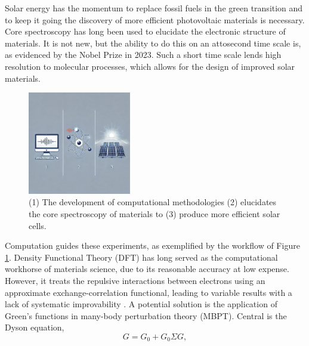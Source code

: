 Solar energy has the momentum to replace fossil fuels in the green transition and to keep it going the discovery of more efficient photovoltaic materials is necessary. Core spectroscopy has long been used to elucidate the electronic structure of materials. It is not new, but the ability to do this on an attosecond time scale is, as evidenced by the Nobel Prize in 2023. Such a short time scale lends high resolution to molecular processes, which allows for the design of improved solar materials. 
\begin{figure}
   \centering
   \includegraphics[width=0.4\textwidth]{picture.png}
   \caption{(1) The development of computational methodologies (2) elucidates the core spectroscopy of materials to (3) produce more efficient solar cells.}
   \label{fig:fig1}
\end{figure}
Computation guides these experiments, as exemplified by the workflow of Figure \ref{fig:fig1}. Density Functional Theory (DFT) has long served as the computational workhorse of materials science, due to its reasonable accuracy at low expense. However, it treats the repulsive interactions between electrons using an approximate exchange-correlation functional, leading to variable results with a lack of systematic improvability \cite{kozlowski_elucidating_2021}. A potential solution is the application of Green's functions in many-body perturbation theory (MBPT). Central is the Dyson equation,
\begin{equation}
G = G_0 + G_0 \Sigma G,
\label{eqn:dyson}
\end{equation}
